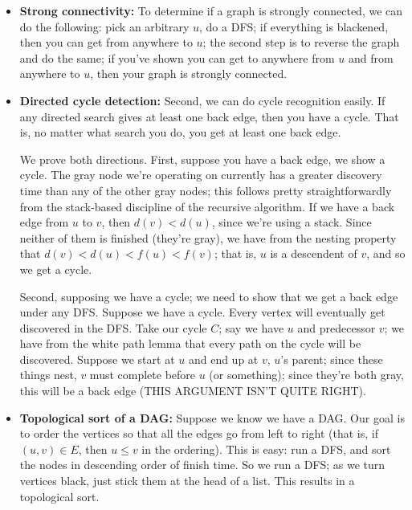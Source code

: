 \documentclass{article}
\begin{document}
\begin{itemize}
\item
\textbf{Strong connectivity:}
To determine if a graph is strongly connected, we can do the 
following: pick an arbitrary $u$, do a DFS; if everything is blackened, then
you can get from anywhere to $u$; the second step is to 
reverse the graph and do the same; if you've shown you can get to anywhere 
from $u$
and from anywhere to $u$, then your graph is strongly connected.

\item
\textbf{Directed cycle detection:}
Second, we can do cycle recognition  easily.
If any directed search gives at least one back edge, then you have a cycle.
That is, no matter what search you do, you get at least one back edge.

We prove both directions.
First, suppose you have a back edge, we show a cycle.
The gray node we're operating on currently has a greater discovery
time than any of the other gray  nodes; this follows pretty straightforwardly
from the stack-based discipline of the recursive algorithm.
If we have a back edge from $u$ to $v$, then $d(v) < d(u)$, since we're
using a stack. Since neither of them is finished (they're gray), we have from
the nesting property that $d(v) < d(u) < f(u) < f(v)$; that is, $u$
is a descendent of $v$, and so we get a cycle.

Second, supposing we have a cycle; we need to show that we get a  back
edge under any DFS.
Suppose we have a cycle.
Every vertex will eventually get discovered in the DFS.
Take our cycle $C$; say we have $u$ and predecessor $v$; we have from the
white path lemma that every path on the cycle will be discovered.
Suppose we start at $u$ and end up at $v$, $u$'s parent; since
these things nest, $v$ must complete before $u$ (or something); since they're
both gray, this will be a back edge (THIS ARGUMENT ISN'T QUITE RIGHT).


\item
\textbf{Topological sort of a DAG:}
Suppose we know we have a DAG.
Our goal is to order the vertices so that all the edges go from left to
right (that is, if $(u,v) \in E$, then $u\leq v$ in the ordering).
This is easy: run a DFS, and sort the nodes in descending order of
finish time.
So we run a DFS; as we turn vertices black, just stick them at the head of a 
list.
This results in a topological sort.


\end{itemize}
\end{document}
